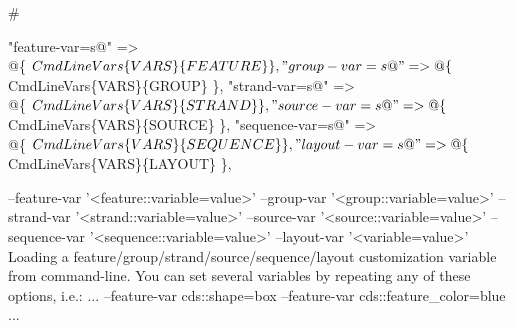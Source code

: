 \documentclass[11pt]{article}
\def\nwendcode{\endtrivlist \endgroup} %
\let\nwdocspar=\par                    %
\begin{document}

\label{todo:BBD}
\nwenddocs{}%
%
%
%
%
\nwdocspar
\nwenddocs{}%
%
\nwdocspar
\todo{ \item \todoBBD } %
\nwenddocs{}\plusendmoddef
#
\nwendcode{}\nwdocspar

\nwenddocs{}\endmoddef
"feature-var=s@"  => \\@\{ $CmdLineVars\{VARS\}\{FEATURE\} \},
"group-var=s@"    => \\@\{ $CmdLineVars\{VARS\}\{GROUP\} \},
"strand-var=s@"   => \\@\{ $CmdLineVars\{VARS\}\{STRAND\} \},
"source-var=s@"   => \\@\{ $CmdLineVars\{VARS\}\{SOURCE\} \},
"sequence-var=s@" => \\@\{ $CmdLineVars\{VARS\}\{SEQUENCE\} \},
"layout-var=s@"   => \\@\{ $CmdLineVars\{VARS\}\{LAYOUT\} \},
\nwendcode{}\nwdocspar
\nwenddocs{}\endmoddef
 --feature-var '<feature::variable=value>'
   --group-var '<group::variable=value>'
  --strand-var '<strand::variable=value>' 
  --source-var '<source::variable=value>'
--sequence-var '<sequence::variable=value>'
  --layout-var '<variable=value>'
         Loading a feature/group/strand/source/sequence/layout
         customization variable from command-line. You can set
         several variables by repeating any of these options, 
         i.e.:
... --feature-var cds::shape=box --feature-var cds::feature_color=blue ... 
\nwendcode{}\nwdocspar
\nwenddocs{}%
%
%
%
%
%
%
%
%
%
%
%
%
\nwdocspar
\nwenddocs{}%
%
%
%
%
%
%
%
%
%
%
%
%
\nwdocspar
\end{document}
